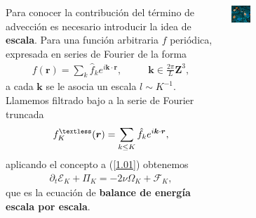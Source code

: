 \documentclass[20pt,margin=1in,innermargin=-4.5in,blockverticalspace=-0.25in]{tikzposter}
\begin{document}
\begin{columns}
{		Para conocer la contribución del término de advección es necesario introducir la idea de \textbf{escala}. Para una función arbitraria $f$ periódica, expresada en series de Fourier de la forma
		\begin{align}
            f(\boldsymbol{r})= \sum_{k}\hat{f}_ke^{i\boldsymbol{k}\cdot \boldsymbol{r}}, \:\:\:\:\:\:\:\:\:\:\:\: \boldsymbol{k}\in \frac{2\pi}{L}\boldsymbol{Z}^{3},
            \label{3.1}
        \end{align}
        a cada $\boldsymbol{k}$ se le asocia un escala $l\sim K^{-1}$. Llamemos filtrado bajo a la serie de Fourier truncada
        \begin{align}
            f^{\textless}_{K}(\boldsymbol{r})= \sum_{k\leq K}\hat{f}_ke^{i\boldsymbol{k}\cdot \boldsymbol{r}},
        \end{align}
        aplicando el concepto a (\ref{1.01}) obtenemos
        \begin{align}
            \partial_t \mathcal{E}_K + \Pi_K = -2\nu\Omega_K+\mathcal{F}_K,
            \label{3.8}
        \end{align}
		que es la ecuación de \textbf{balance de energía escala por escala}.
		\begin{center}
		   \includegraphics[width=0.15\textwidth ]{figuras/vortices.png}
		\end{center}
		}
    
\end{columns}
\end{document}
